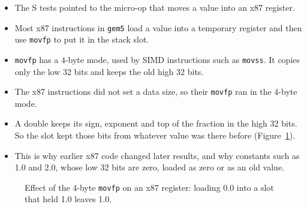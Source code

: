 \begin{itemize}
    \item The S tests pointed to the micro-op that moves a value into an x87 register.
    \item Most x87 instructions in \texttt{gem5} load a value into a temporary register and then use \texttt{movfp} to put it in the stack slot.
    \item \texttt{movfp} has a 4-byte mode, used by SIMD instructions such as \texttt{movss}. It copies only the low 32 bits and keeps the old high 32 bits.
    \item The x87 instructions did not set a data size, so their \texttt{movfp} ran in the 4-byte mode.
    \item A double keeps its sign, exponent and top of the fraction in the high 32 bits. So the slot kept those bits from whatever value was there before (Figure~\ref{fig:chr_movfp}).
    \item This is why earlier x87 code changed later results, and why constants such as 1.0 and 2.0, whose low 32 bits are zero, loaded as zero or as an old value.
\end{itemize}

\begin{figure}[htbp]
\centering
{}
\caption{Effect of the 4-byte \texttt{movfp} on an x87 register: loading 0.0 into a slot that held 1.0 leaves 1.0.}
\label{fig:chr_movfp}
\end{figure}

